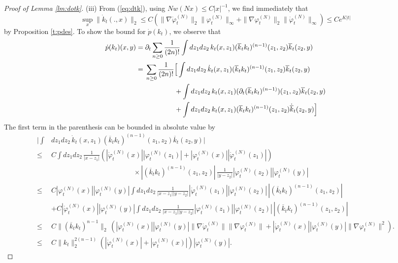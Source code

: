 \documentclass[11pt,a4paper]{article}
\newcommand{\ph}{\varphi_t^{(N)}}	%
\newcommand{\phdot}{\dot{\varphi}_t^{(N)}}	%
\begin{document}
\begin{proof}[Proof of Lemma \ref{lm:dotk}]
(iii)  {F}rom (\ref{eq:dtk}), using $N w(Nx) \leq C|x|^{-1}$, we find immediately that
\[ \sup_x \| \dot{k}_t (.,x) \|_2 \leq C \left(\| \nabla \phdot \|_2 \| \ph \|_\infty + \| \nabla \ph \|_2 \|\phdot\|_\infty \right) \leq C e^{K|t|} \]
by Proposition \ref{t:pdes}. To show the bound for $\dot{p} (k_t)$, we observe that
\begin{equation}\label{eq:px2} \begin{split}
\dot{p} (k_t) (x,y) = \; & \partial_t \sum_{n \geq 0}\frac{1}{(2n)!} \int dz_1 dz_2 \, k_t (x,z_1) (\overline{k}_t k_t)^{(n-1)} (z_1 ,z_2) \overline{k}_t (z_2 ,y ) \\ = \;& \sum_{n \geq 0}\frac{1}{(2n)!} \Big[  \int dz_1 dz_2 \, \dot{k}_t (x,z_1) (\overline{k}_t k_t)^{(n-1)} (z_1 ,z_2) \overline{k}_t (z_2 ,y ) \\ &\hspace{1.5cm} +
 \int dz_1 dz_2 \, k_t (x,z_1) (\partial_t (\overline{k}_t k_t)^{(n-1)}) (z_1 ,z_2) \overline{k}_t (z_2 ,y )\\
  &\hspace{1.5cm} + \int dz_1 dz_2 \, k_t (x,z_1) (\overline{k}_t k_t)^{(n-1)} (z_1 ,z_2) \dot{\overline{k}}_t (z_2 ,y ) \Big]  \end{split} \end{equation}
The first term in the parenthesis can be bounded in absolute value by
\[ \begin{split} 
\Big| \int &dz_1 dz_2 \, \dot{k}_t (x,z_1) (\overline{k}_t k_t)^{(n-1)} (z_1 ,z_2) \overline{k}_t (z_2 ,y ) \Big| \\ \leq \; &C \int dz_1 dz_2 \, \frac{1}{|x-z_1|} \left( |\phdot (x)| |\ph (z_1)|+ |\ph (x)| |\phdot (z_1)| \right)  \\ &\hspace{5cm} \times | (\overline{k}_t k_t)^{(n-1)} (z_1 ,z_2)| \, \frac{1}{|y-z_2|} |\ph (z_2)| |\ph (y)| \\
\leq \; &C |\ph (x)| |\ph (y)| \int dz_1 dz_2 \, \frac{1}{|x-z_1||y-z_2|} |\phdot (z_1)|  |\ph (z_2)| \,  | (\overline{k}_t k_t)^{(n-1)} (z_1 ,z_2)| \\
&+ C |\phdot (x)| |\ph (y)| \int dz_1 dz_2 \, \frac{1}{|x-z_1||y-z_2|} |\ph (z_1)|  |\ph (z_2)| \,  | (\overline{k}_t k_t)^{(n-1)} (z_1 ,z_2)| 
\\ \leq \; & C \| (\overline{k}_t k_t)^{n-1} \|_2  \, \left( |\ph (x)| |\ph (y)| \| \nabla \phdot \| \| \nabla \ph \| +   |\phdot (x)| |\ph (y)| \| \nabla \ph \|^2 \right).
\\ \leq \; & C \| k_t \|_2^{2(n-1)} (|\phdot (x)| + |\ph (x)|) |\ph (y)|. 

\end{split}\]
\end{proof}
\end{document}
